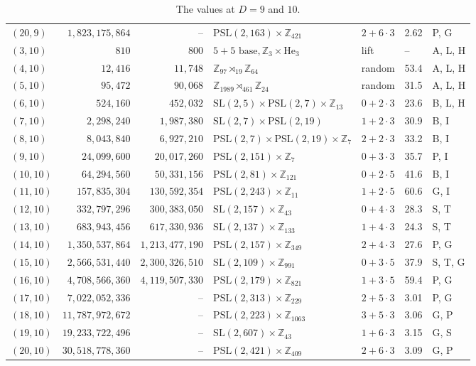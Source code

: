 \documentclass[11pt]{amsart}
\theoremstyle{definition}
\theoremstyle{remark}
\begin{document}
\begin{table}[ht]
\begin{tabular}{@{}lrr>{\raggedright}p{}llp{}@{}}
$(20,9)$ & $1{,}823{,}175{,}864$ & -- & $\mathrm{PSL}(2,163)\times\mathbb{Z}_{421}$ & $2+6\cdot3$ & 2.62 & P, G\\
$(3,10)$ & $810$ & $800$ & $5+5 \text{ base}, \mathbb{Z}_3\times\mathrm{He}_3$ & lift & -- & A, L, H\\
$(4,10)$ & $12{,}416$ & $11{,}748$ & $\mathbb{Z}_{97}\rtimes_{19}\mathbb{Z}_{64}$ & random & 53.4 & A, L, H\\
$(5,10)$ & $95{,}472$ & $90{,}068$ & $\mathbb{Z}_{1989}\rtimes_{461}\mathbb{Z}_{24}$ & random & 31.5 & A, L, H\\
$(6,10)$ & $524{,}160$ & $452{,}032$ & $\mathrm{SL}(2,5)\times\mathrm{PSL}(2,7)\times\mathbb{Z}_{13}$ & $0+2\cdot3$ & 23.6 & B, L, H\\
$(7,10)$ & $2{,}298{,}240$ & $1{,}987{,}380$ & $\mathrm{SL}(2,7)\times\mathrm{PSL}(2,19)$ & $1+2\cdot3$ & 30.9 & B, I\\
$(8,10)$ & $8{,}043{,}840$ & $6{,}927{,}210$ & $\mathrm{PSL}(2,7)\times\mathrm{PSL}(2,19)\times\mathbb{Z}_{7}$ & $2+2\cdot3$ & 33.2 & B, I\\
$(9,10)$ & $24{,}099{,}600$ & $20{,}017{,}260$ & $\mathrm{PSL}(2,151)\times\mathbb{Z}_{7}$ & $0+3\cdot3$ & 35.7 & P, I\\
$(10,10)$ & $64{,}294{,}560$ & $50{,}331{,}156$ & $\mathrm{PSL}(2,81)\times\mathbb{Z}_{121}$ & $0+2\cdot5$ & 41.6 & B, I\\
$(11,10)$ & $157{,}835{,}304$ & $130{,}592{,}354$ & $\mathrm{PSL}(2,243)\times\mathbb{Z}_{11}$ & $1+2\cdot5$ & 60.6 & G, I\\
$(12,10)$ & $332{,}797{,}296$ & $300{,}383{,}050$ & $\mathrm{SL}(2,157)\times\mathbb{Z}_{43}$ & $0+4\cdot3$ & 28.3 & S, T\\
$(13,10)$ & $683{,}943{,}456$ & $617{,}330{,}936$ & $\mathrm{SL}(2,137)\times\mathbb{Z}_{133}$ & $1+4\cdot3$ & 24.3 & S, T\\
$(14,10)$ & $1{,}350{,}537{,}864$ & $1{,}213{,}477{,}190$ & $\mathrm{PSL}(2,157)\times\mathbb{Z}_{349}$ & $2+4\cdot3$ & 27.6 & P, G\\
$(15,10)$ & $2{,}566{,}531{,}440$ & $2{,}300{,}326{,}510$ & $\mathrm{SL}(2,109)\times\mathbb{Z}_{991}$ & $0+3\cdot5$ & 37.9 & S, T, G\\
$(16,10)$ & $4{,}708{,}566{,}360$ & $4{,}119{,}507{,}330$ & $\mathrm{PSL}(2,179)\times\mathbb{Z}_{821}$ & $1+3\cdot5$ & 59.4 & P, G\\
$(17,10)$ & $7{,}022{,}052{,}336$ & -- & $\mathrm{PSL}(2,313)\times\mathbb{Z}_{229}$ & $2+5\cdot3$ & 3.01 & P, G\\
$(18,10)$ & $11{,}787{,}972{,}672$ & -- & $\mathrm{PSL}(2,223)\times\mathbb{Z}_{1063}$ & $3+5\cdot3$ & 3.06 & G, P\\
$(19,10)$ & $19{,}233{,}722{,}496$ & -- & $\mathrm{SL}(2,607)\times\mathbb{Z}_{43}$ & $1+6\cdot3$ & 3.15 & G, S\\
$(20,10)$ & $30{,}518{,}778{,}360$ & -- & $\mathrm{PSL}(2,421)\times\mathbb{Z}_{409}$ & $2+6\cdot3$ & 3.09 & G, P\\
\bottomrule
\end{tabular}
\caption{The values at $D=9$ and $10$.}
\label{tab:haar910}
\end{table}
\end{document}
